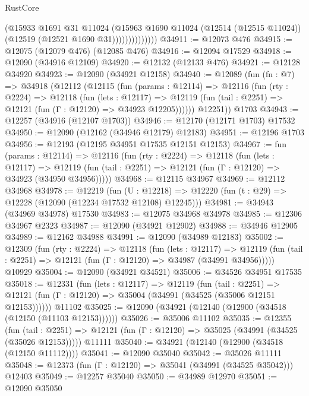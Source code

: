\begin{lexlean}{RustCore}
\begin{coremodule}
                        (@15933
                          @1691
                          @31
                          @11024
                          (@15963
                            @1690
                            @11024
                            (@12514 (@12515 @11024))
                            (@12519 (@12521 @1690 @31))))))))))))))
@34911 := @12073 @476
@34915 := @12075 (@12079 @476) (@12085 @476)
@34916 := @12094 @17529
@34918 := @12090 (@34916 @12109)
@34920 := @12132 (@12133 @476)
@34921 := @12128 @34920
@34923 := @12090 (@34921 @12158)
@34940 := @12089
    (fun (fn : @7) =>
    @34918
      (@12112
        (@12115
          (fun (params : @12114) =>
          @12116
            (fun (rty : @2224) =>
            @12118
              (fun (lets : @12117) =>
              @12119 (fun (tail : @2251) => @12121 (fun (Γ : @12120) => @34923 @12205))))))
        @12251))
    @1703
@34943 := @12257 (@34916 (@12107 @1703))
@34946 := @12170 (@12171 @1703) @17532
@34950 := @12090 (@12162 (@34946 @12179) @12183)
@34951 := @12196 @1703
@34956 := @12193 (@12195 @34951 @17535 @12151 @12153)
@34967 := fun (params : @12114) =>
  @12116
    (fun (rty : @2224) =>
    @12118
      (fun (lets : @12117) =>
      @12119 (fun (tail : @2251) => @12121 (fun (Γ : @12120) => @34923 (@34950 @34956)))))
@34968 := @12115 @34967
@34969 := @12112 @34968
@34978 := @12219
    (fun (U : @12218) => @12220 (fun (t : @29) => @12228 (@12090 (@12234 @17532 @12108) @12245)))
@34981 := @34943 (@34969 @34978) @17530
@34983 := @12075 @34968 @34978
@34985 := @12306 @34967 @2323
@34987 := @12090 (@34921 @12902)
@34988 := @34946 @12905
@34989 := @12162 @34988
@34991 := @12090 (@34989 @12183)
@35002 := @12309
    (fun (rty : @2224) =>
    @12118
      (fun (lets : @12117) =>
      @12119 (fun (tail : @2251) => @12121 (fun (Γ : @12120) => @34987 (@34991 @34956)))))
    @10929
@35004 := @12090 (@34921 @34521)
@35006 := @34526 @34951 @17535
@35018 := @12331
    (fun (lets : @12117) =>
    @12119
      (fun (tail : @2251) =>
      @12121 (fun (Γ : @12120) => @35004 (@34991 (@34525 (@35006 @12151 @12153))))))
    @11102
@35025 := @12090 (@34921 (@12140 (@12900 (@34518 (@12150 (@11103 @12153))))))
@35026 := @35006 @11102
@35035 := @12355
    (fun (tail : @2251) => @12121 (fun (Γ : @12120) => @35025 (@34991 (@34525 (@35026 @12153)))))
    @11111
@35040 := @34921 (@12140 (@12900 (@34518 (@12150 @11112))))
@35041 := @12090 @35040
@35042 := @35026 @11111
@35048 := @12373 (fun (Γ : @12120) => @35041 (@34991 (@34525 @35042))) @12403
@35049 := @12257 @35040
@35050 := @34989 @12970
@35051 := @12090 @35050

\end{coremodule}
\end{lexlean}
